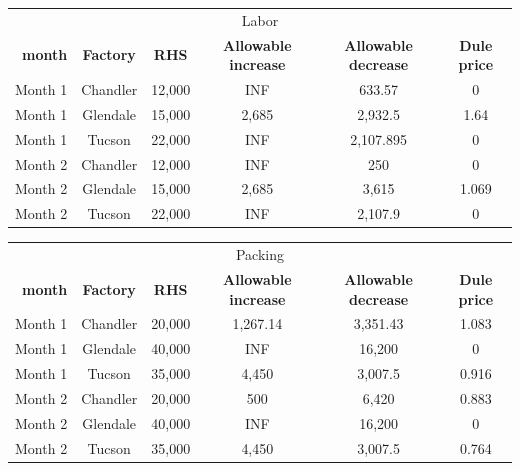 \documentclass[12pt]{article}
\begin{document}
\begin{itemize}
	
\begin{center}
\begin{tabular}{c c c c c c }
\hline
\multicolumn{6}{c}{Labor} \\
\ \textbf{month} &\textbf{Factory} &\textbf{RHS} & \textbf{Allowable increase} & \textbf{Allowable decrease} &  \textbf{Dule price}\\
\hline
Month 1     &Chandler  &12,000    &INF   &633.57    &0\\
Month 1     &Glendale  &15,000    &2,685 &2,932.5   &1.64\\
Month 1     &Tucson    &22,000    &INF   &2,107.895 &0\\
Month 2     &Chandler  &12,000    &INF   &250       &0\\
Month 2     &Glendale  &15,000    &2,685 &3,615     &1.069\\
Month 2     &Tucson    &22,000    &INF   &2,107.9   &0\\
\hline
\end{tabular}
\end{center}

\begin{center}
\begin{tabular}{c c c c c c }
\hline
\multicolumn{6}{c}{Packing} \\
\ \textbf{month} &\textbf{Factory} &\textbf{RHS} & \textbf{Allowable increase} & \textbf{Allowable decrease} &  \textbf{Dule price}\\
\hline
Month 1     &Chandler  &20,000    &1,267.14   &3,351.43    &1.083\\
Month 1     &Glendale  &40,000    &INF      &16,200   &0\\
Month 1     &Tucson    &35,000    &4,450   &3,007.5 &0.916\\
Month 2     &Chandler  &20,000    &500      &6,420       &0.883\\
Month 2     &Glendale  &40,000    &INF       &16,200     &0\\
Month 2     &Tucson    &35,000    &4,450   &3,007.5   &0.764\\
\hline
\end{tabular}
\end{center}


\end{itemize}
\end{document}
